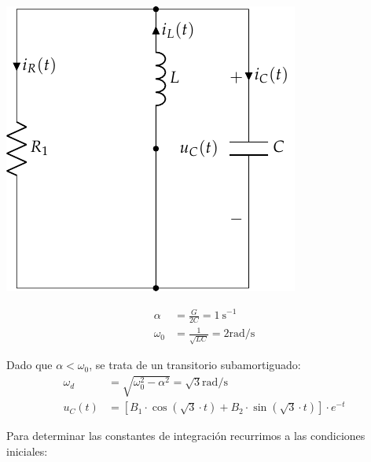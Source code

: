 \vspace{3mm}
\begin{minipage}{0.3\textwidth}
  \includegraphics[scale=0.9]{figuras/FM_4_9_natural}
\end{minipage}
\begin{minipage}{0.7\textwidth}
  \begin{align*}
    \alpha &= \frac{G}{2C} = \SI{1}{\second}^{-1}\\
    \omega_0 &= \frac{1}{\sqrt{LC}} = 2\si{\radian\per\second}
  \end{align*}
\end{minipage}

\bigskip

Dado que $\alpha < \omega_0$, se trata de un transitorio
subamortiguado:
\begin{align*}
  \omega_d &= \sqrt{\omega_0^2 - \alpha^2} = \sqrt{3}\si{\radian\per\second}\\
  u_C(t) &= [B_1 \cdot \cos(\sqrt{3} \cdot t) + B_2 \cdot \sin(\sqrt{3} \cdot t)] \cdot e^{-t}
\end{align*}

\vspace{2mm}
Para determinar las constantes de integración recurrimos a las
condiciones iniciales:

